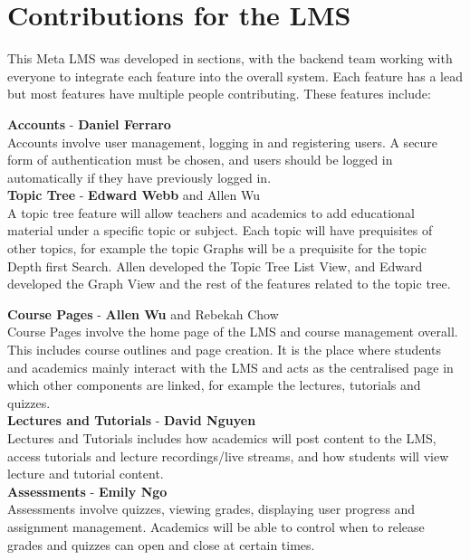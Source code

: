 \section{Contributions for the LMS}
This Meta LMS was developed in sections, with the backend team working with everyone to integrate each feature into the overall system. Each feature has a lead but most features have multiple people contributing. These features include:

\textbf{Accounts} - \textbf{Daniel Ferraro} \\
Accounts involve user management, logging in and registering users. A secure form of authentication must be chosen, and users should be logged in automatically if they have previously logged in. \\

\textbf{Topic Tree} - \textbf{Edward Webb} and Allen Wu \\
A topic tree feature will allow teachers and academics to add educational material under a specific topic or subject. Each topic will have prequisites of other topics, for example the topic Graphs will be a prequisite for the topic Depth first Search. Allen developed the Topic Tree List View, and Edward developed the Graph View and the rest of the features related to the topic tree.

\textbf{Course Pages} - \textbf{Allen Wu} and Rebekah Chow \\
Course Pages involve the home page of the LMS and course management overall. This includes course outlines and page creation. It is the place where students and academics mainly interact with the LMS and acts as the centralised page in which other components are linked, for example the lectures, tutorials and quizzes. \\

\textbf{Lectures and Tutorials} - \textbf{David Nguyen} \\
Lectures and Tutorials includes how academics will post content to the LMS, access tutorials and lecture recordings/live streams, and how students will view lecture and tutorial content.\\

\textbf{Assessments} - \textbf{Emily Ngo} \\
Assessments involve quizzes, viewing grades, displaying user progress and assignment management. Academics will be able to control when to release grades and quizzes can open and close at certain times. \\

